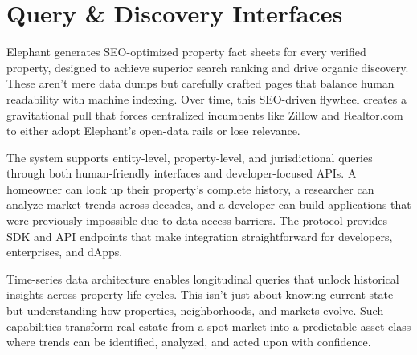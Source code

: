 \section{Query \& Discovery Interfaces}

Elephant generates SEO-optimized property fact sheets for every verified property, designed to achieve superior search ranking and drive organic discovery. These aren't mere data dumps but carefully crafted pages that balance human readability with machine indexing. Over time, this SEO-driven flywheel creates a gravitational pull that forces centralized incumbents like Zillow and Realtor.com to either adopt Elephant's open-data rails or lose relevance.

The system supports entity-level, property-level, and jurisdictional queries through both human-friendly interfaces and developer-focused APIs. A homeowner can look up their property's complete history, a researcher can analyze market trends across decades, and a developer can build applications that were previously impossible due to data access barriers. The protocol provides SDK and API endpoints that make integration straightforward for developers, enterprises, and dApps.

Time-series data architecture enables longitudinal queries that unlock historical insights across property life cycles. This isn't just about knowing current state but understanding how properties, neighborhoods, and markets evolve. Such capabilities transform real estate from a spot market into a predictable asset class where trends can be identified, analyzed, and acted upon with confidence.


